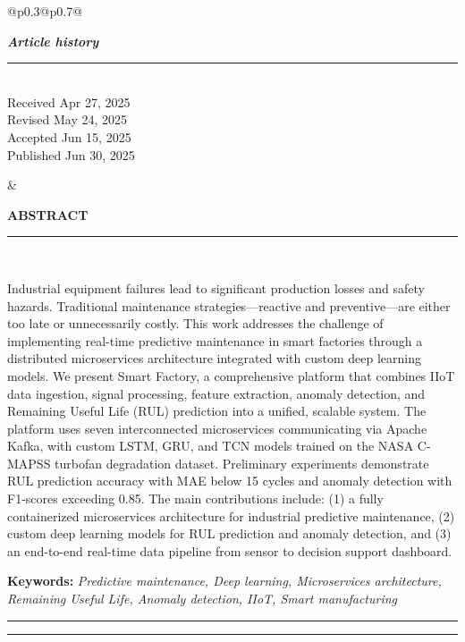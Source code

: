 \documentclass{ijceds} %
\begin{document}
\noindent
\begin{tabular}{@{}p{0.3\textwidth}@{}p{0.7\textwidth}@{}}
\begin{minipage}[t]{\linewidth}
\raggedright
\textbf{\textit{Article history}} \\
\rule{\linewidth}{0.4pt} \\[0.3em]
Received Apr 27, 2025 \\[0.2em]
Revised May 24, 2025 \\[0.2em]
Accepted Jun 15, 2025 \\[0.2em]
Published Jun 30, 2025
\end{minipage}
&
\begin{minipage}[t]{\linewidth}
\textbf{ABSTRACT} \\
\rule{\linewidth}{0.4pt} \\[0.3em]
\small
\justifying

Industrial equipment failures lead to significant production losses and safety hazards. Traditional maintenance strategies—reactive and preventive—are either too late or unnecessarily costly. This work addresses the challenge of implementing real-time predictive maintenance in smart factories through a distributed microservices architecture integrated with custom deep learning models. We present Smart Factory, a comprehensive platform that combines IIoT data ingestion, signal processing, feature extraction, anomaly detection, and Remaining Useful Life (RUL) prediction into a unified, scalable system. The platform uses seven interconnected microservices communicating via Apache Kafka, with custom LSTM, GRU, and TCN models trained on the NASA C-MAPSS turbofan degradation dataset. Preliminary experiments demonstrate RUL prediction accuracy with MAE below 15 cycles and anomaly detection with F1-scores exceeding 0.85. The main contributions include: (1) a fully containerized microservices architecture for industrial predictive maintenance, (2) custom deep learning models for RUL prediction and anomaly detection, and (3) an end-to-end real-time data pipeline from sensor to decision support dashboard.

\vspace{0.8em}
\textbf{Keywords:} \textit{Predictive maintenance, Deep learning, Microservices architecture, Remaining Useful Life, Anomaly detection, IIoT, Smart manufacturing}

\end{minipage}
\end{tabular}

\vspace{1em}
\hrule
\vspace{0.2em}
\hrule
\vspace{1em}
\end{document}
